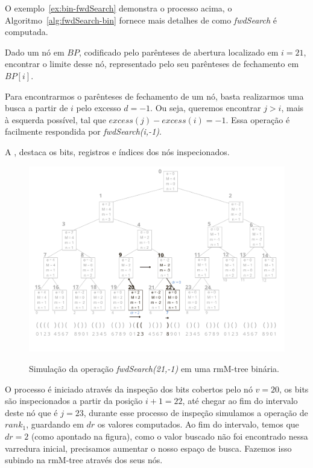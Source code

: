     O exemplo~\ref*{ex:bin-fwdSearch} demonstra o processo acima, o Algoritmo~\ref{alg:fwdSearch-bin} fornece mais detalhes de como \textit{fwdSearch} é computada.

    \begin{example}\label{ex:bin-fwdSearch} 
        Dado um nó em $BP$, codificado pelo parênteses de abertura localizado em $i=21$, encontrar o limite desse nó, representado pelo seu parênteses de fechamento em $BP[i]$. 
        
        Para encontrarmos o parênteses de fechamento de um nó, basta realizarmos uma busca a partir de $i$ pelo excesso $d=-1$. Ou seja, queremos encontrar $j>i$, mais à esquerda possível, tal que $excess(j) - excess(i) = -1$.
        Essa operação é facilmente respondida por \textit{fwdSearch(i,-1)}.

        A , destaca os bits, registros e índices dos nós inspecionados.
        \begin{figure}[h!]
           \centering
             \caption[fwdSearch(21,-1).]{Simulação da operação \textit{fwdSearch(21,-1)} em uma rmM-tree binária.}
             \includegraphics[width=\columnwidth]{images/rmm-tree-bin-fwdsearch.png}
             \label{fig:bin-fwdSearch}
        \end{figure}

        O processo é iniciado através da inspeção dos bits cobertos pelo nó $v=20$, os bits são inspecionados a partir da posição $i+1=22$, até chegar ao
        fim do intervalo deste nó que é $j=23$, durante esse processo de inspeção simulamos a operação de $rank_1$, guardando em $dr$ os valores computados. 
        Ao fim do intervalo, temos que $dr=2$ (como apontado na figura), como o valor buscado não foi encontrado nessa varredura inicial, precisamos aumentar o nosso espaço de busca. Fazemos isso subindo na rmM-tree através dos seus nós. 
        

\end{example}
